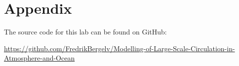 \appendix
\section{Appendix}
The source code for this lab can be found on GitHub:

\begin{center}
\url{https://github.com/FredrikBergelv/Modelling-of-Large-Scale-Circulation-in-Atmosphere-and-Ocean}
\end{center}